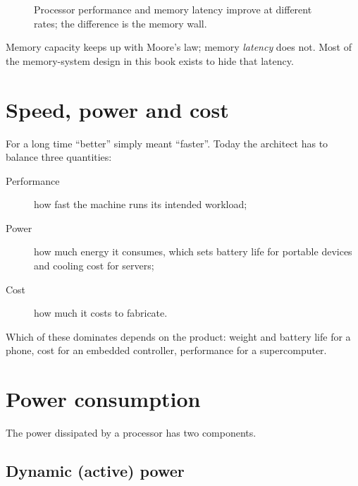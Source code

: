 \documentclass[../main.tex]{subfiles}
\begin{document}
\begin{figure}[htbp]
  \centering
  
  \caption{Processor performance and memory latency improve at different
    rates; the difference is the memory wall.}
  \label{fig:memory-wall}
\end{figure}

\begin{keypoint}
  Memory capacity keeps up with Moore's law; memory \emph{latency} does not.
  Most of the memory-system design in this book exists to hide that
  latency.
\end{keypoint}

\section{Speed, power and cost}

For a long time \enquote{better} simply meant \enquote{faster}.  Today the
architect has to balance three quantities:
\begin{description}
  \item[Performance] how fast the machine runs its intended workload;
  \item[Power] how much energy it consumes, which sets battery life for
    portable devices and cooling cost for servers;
  \item[Cost] how much it costs to fabricate.
\end{description}
Which of these dominates depends on the product: weight and battery life for
a phone, cost for an embedded controller, performance for a supercomputer.

\section{Power consumption}

The power dissipated by a processor has two components.

\subsection{Dynamic (active) power}
\end{document}
